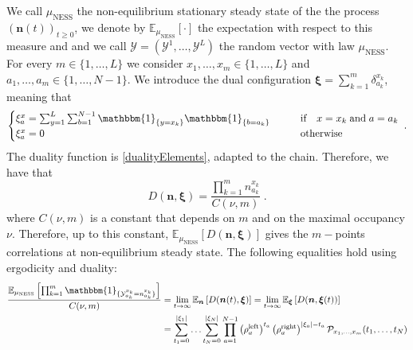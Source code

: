 \documentclass[10pt]{article}
\numberwithin{equation}{section}
\numberwithin{equation}{subsection}
\newcommand{\dt}{\;.}
\begin{document}
We call $\mu_{\text{NESS}}$ the non-equilibrium stationary steady state of the the process $(\bm{n}(t))_{t\geq 0}$, we denote by $\mathbb{E}_{\mu_{\text{NESS}}}[\cdot]$ the expectation with respect to this measure and and we call $\bm{\mathcal{Y}} = (\mathcal{Y}^{1},\ldots,\mathcal{Y}^{L})$ the random vector with law $\mu_{\text{NESS}}$. For every $m\in\{1,\ldots,L\}$ we consider  $x_{1},\ldots,x_{m}\in\{1,\ldots,L\}$ and $a_{1},\ldots,a_{m}\in \{1,\ldots,N-1\}$. We introduce the dual configuration  $\bm{\xi}=\sum_{k=1}^{m}\delta_{a_{k}}^{x_{k}}$, meaning that 
\begin{equation}
	\begin{cases}
		\xi_{a}^{x}=\sum_{y=1}^{L}\sum_{b=1}^{N-1}\mathbbm{1}_{\{y=x_{k}\}}\mathbbm{1}_{\{b=a_{k}\}}\qquad &\text{if}\quad x=x_{k}\;\text{and} \; a=a_{k}\\
		\xi_{a}^{x}=0\qquad &\text{otherwise}
	\end{cases}\dt
\end{equation}
The duality function is \eqref{dualityElements}, adapted to the chain. Therefore, we have that
\begin{equation}
	D(\bm{n},\bm{\xi})= \frac{\prod_{k=1}^{m}n_{a_{k}}^{x_{k}}}{C(\nu,m)}\dt
\end{equation}
where $C(\nu,m)$ is a constant that depends on $m$ and on the maximal occupancy $\nu$. 
Therefore, up to this constant, $\mathbb{E}_{\mu_{\text{NESS}}}\left[D(\bm{n},\bm{\xi})\right]$ gives the $m-$points correlations at non-equilibrium steady state. The following equalities hold using ergodicity and duality:
\begin{equation}\label{ExptationSS}
	\begin{split}
		\frac{\mathbb{E}_{\mu_{\text{NESS}}}\left[\prod_{k=1}^{m}\mathbbm{1}_{\{\mathcal{Y}_{a_{k}}^{x_{k}}=n_{a_{k}}^{x_{k}}\}}\right]}{C(\nu,m)}&=\lim_{t\to\infty}\mathbb{E}_{\bm{n}}\left[D(\bm{n}(t),\bm{\xi})\right]=\lim_{t\to\infty}\mathbb{E}_{\bm{\xi}}\left[D(\bm{n},\bm{\xi}(t))\right]
		\\&=
		\sum_{t_{1}=0}^{|\xi_{1}|}\ldots\sum_{t_{N}=0}^{|\xi_{N}|}\prod_{a=1}^{N-1}\left(\rho_{a}^{\text{left}}\right)^{t_{a}}\left(\rho_{a}^{\text{right}}\right)^{|\xi_{a}|-t_{a}}\mathcal{P}_{x_{1},\ldots,x_{m}}(t_{1},\ldots,t_{N})
	\end{split}
\end{equation}
\end{document}
